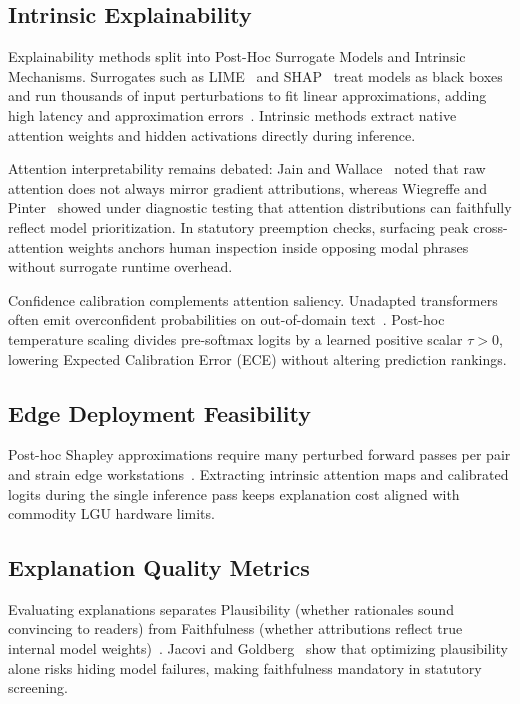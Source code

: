    \subsection{Intrinsic Explainability}
    Explainability methods split into Post-Hoc Surrogate Models and Intrinsic Mechanisms. Surrogates such as LIME~\cite{ribeiro2016why} and SHAP~\cite{lundberg2017unified} treat models as black boxes and run thousands of input perturbations to fit linear approximations, adding high latency and approximation errors~\cite{rudin2019stop}. Intrinsic methods extract native attention weights and hidden activations directly during inference.
    
    Attention interpretability remains debated: Jain and Wallace~\cite{jain2019attention} noted that raw attention does not always mirror gradient attributions, whereas Wiegreffe and Pinter~\cite{wiegreffe2019attention} showed under diagnostic testing that attention distributions can faithfully reflect model prioritization. In statutory preemption checks, surfacing peak cross-attention weights anchors human inspection inside opposing modal phrases without surrogate runtime overhead.
    
    Confidence calibration complements attention saliency. Unadapted transformers often emit overconfident probabilities on out-of-domain text~\cite{guo2017calibration}. Post-hoc temperature scaling divides pre-softmax logits by a learned positive scalar $\tau > 0$, lowering Expected Calibration Error (ECE) without altering prediction rankings.

    \subsection{Edge Deployment Feasibility}
    Post-hoc Shapley approximations require many perturbed forward passes per pair and strain edge workstations~\cite{kumar2020problems, wang2020edge}. Extracting intrinsic attention maps and calibrated logits during the single inference pass keeps explanation cost aligned with commodity LGU hardware limits.

    \subsection{Explanation Quality Metrics}
    Evaluating explanations separates Plausibility (whether rationales sound convincing to readers) from Faithfulness (whether attributions reflect true internal model weights)~\cite{jacovi2020towards, doshi2017towards}. Jacovi and Goldberg~\cite{jacovi2020towards} show that optimizing plausibility alone risks hiding model failures, making faithfulness mandatory in statutory screening.
    
